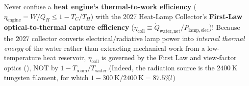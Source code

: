 \begin{devicebox}
Never confuse a \textbf{heat engine's thermal-to-work efficiency} ($\eta_{\mathrm{engine}} = W/Q_H \le 1 - T_C/T_H$) with the 2027 Heat-Lamp Collector's \textbf{First-Law optical-to-thermal capture efficiency} ($\eta_{\mathrm{coll}} \equiv \dot{Q}_{\mathrm{water,net}} / P_{\mathrm{lamp,elec}}$)! Because the 2027 collector converts electrical/radiative lamp power into \emph{internal thermal energy} of the water rather than extracting mechanical work from a low-temperature heat reservoir, $\eta_{\mathrm{coll}}$ is governed by the First Law and view-factor optics (), NOT by $1 - T_{\mathrm{room}}/T_{\mathrm{water}}$.(Indeed, the radiation source is the $\SI{2400}{\kelvin}$ tungsten filament, for which $1 - \SI{300}{\kelvin}/\SI{2400}{\kelvin} = 87.5\%$!)
\end{devicebox}

